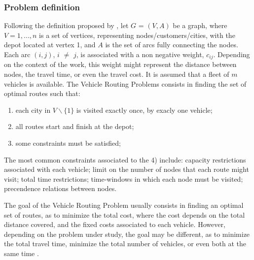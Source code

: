 \subsubsection{Problem definition}

Following the definition proposed by \cite{VRP_exact_heuristic},
let $G$ = $(V,A)$ be a graph, where $V={1, ..., n}$ is a set of vertices,
representing nodes/customers/cities, with the depot located at vertex 1,
and $A$ is the set of arcs fully connecting the nodes. Each arc $(i,j)$, $i$ $\neq$ $j$,
is associated with a non negative weight, $c_{ij}$. Depending on the context 
of the work, this weight might represent the distance between nodes, the travel time,
or even the travel cost. It is assumed that a fleet of $m$ vehicles is available.
The Vehicle Routing Problems consists in finding the set of optimal routes such that:

\begin{enumerate}
  \item each city in $V\backslash\{1\}$ is visited exactly once, by exacly one vehicle;
  \item all routes start and finish at the depot;
  \item some constraints must be satisfied;
\end{enumerate}

The most common constraints associated to the 4) include: capacity restrictions associated with each vehicle; 
limit on the number of nodes that each route might visit; total time restrictions; time-windows
in which each node must be visited; precendence relations between nodes. 

The goal of the Vehicle Routing Problem usually consists in finding an optimal set of routes,
as to minimize the total cost, where the cost depends on the total distance covered, and the fixed costs associated to each vehicle. 
However, depending on the problem under study, the goal may be different, as to  minimize the total travel time, 
minimize the total number of vehicles, or even both at the same time \cite{TDVRP_multi_objective_aco}.

